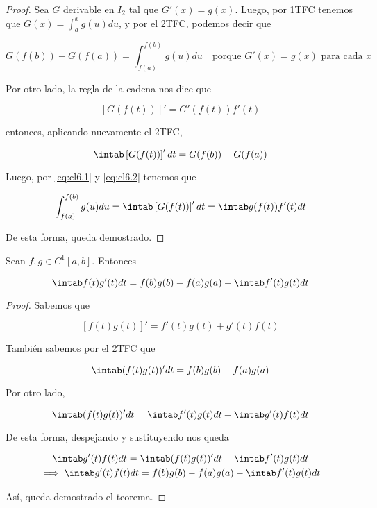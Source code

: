 \begin{proof}
    Sea $G$ derivable en $I_2$ tal que $G'(x) = g(x)$. Luego, por 1TFC tenemos que $G(x) = \int_a^x g(u)du$, y por el 2TFC, podemos decir que
    
    \begin{equation}\label{eq:cl6.1}
        G(f(b))-G(f(a)) = \int_{f(a)}^{f(b)} g(u)du \quad \text{porque $G'(x) = g(x)$ para cada $x$}
    \end{equation}
    
    Por otro lado, la regla de la cadena nos dice que
    
    \[
    \left[ G(f(t)) \right]' = G'(f(t))f'(t)
    \]
    
    \noindent entonces, aplicando nuevamente el 2TFC,
    
    \begin{equation}\label{eq:cl6.2}
        \intab \left[ G(f(t)) \right]'dt = G(f(b)) - G(f(a))
    \end{equation}
    
    Luego, por \ref{eq:cl6.1} y \ref{eq:cl6.2} tenemos que
    
    \[
    \int_{f(a)}^{f(b)} g(u)du = \intab \left[ G(f(t)) \right]'dt = \intab g(f(t))f'(t)dt
    \]
    
    De esta forma, queda demostrado.
\end{proof}

\begin{teo}
    Sean $f, g \in C^1[a,b]$. Entonces
    
    \[
    \intab f(t)g'(t)dt = f(b)g(b) - f(a)g(a) - \intab f'(t)g(t)dt
    \]
\end{teo}

\begin{proof}
    Sabemos que
    
    \[
    [f(t)g(t)]' = f'(t)g(t) + g'(t)f(t)
    \]
    
    También sabemos por el 2TFC que
    
    \[
    \intab (f(t)g(t))'dt = f(b)g(b) - f(a)g(a)
    \]
    
    Por otro lado,
    
    \[
    \intab (f(t)g(t))'dt = \intab f'(t)g(t)dt + \intab g'(t)f(t)dt
    \]
    
    De esta forma, despejando y sustituyendo nos queda
    
    \begin{gather*}
        \intab g'(t)f(t)dt = \intab (f(t)g(t))'dt - \intab f'(t)g(t)dt \\
        \implies \intab g'(t)f(t)dt = f(b)g(b) - f(a)g(a) - \intab f'(t)g(t)dt
    \end{gather*}
    
    Así, queda demostrado el teorema.
\end{proof}
